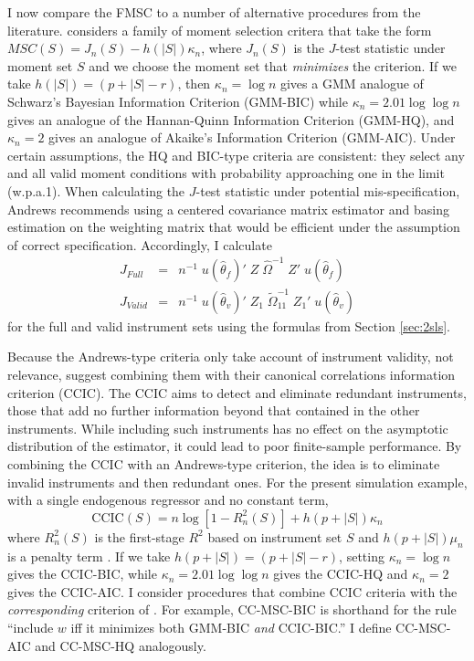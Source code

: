 \documentclass[12pt]{article}
\theoremstyle{definition}
\begin{document}
I now compare the FMSC to a number of alternative procedures from the literature. \cite{Andrews1999} considers a family of moment selection critera that take the form $MSC(S) = J_n(S) - h(|S|)\kappa_n$, where $J_n(S)$ is the $J$-test statistic under moment set $S$ and we choose the moment set that \emph{minimizes} the criterion. If we take $h(|S|) = (p + |S| - r)$, then $\kappa_n = \log{n}$ gives a GMM analogue of Schwarz's Bayesian Information Criterion (GMM-BIC) while $\kappa_n = 2.01 \log{\log{n}}$ gives an analogue of the Hannan-Quinn Information Criterion (GMM-HQ), and $\kappa_n = 2$ gives an analogue of Akaike's Information Criterion (GMM-AIC). Under certain assumptions, the HQ and BIC-type criteria are consistent: they select any and all valid moment conditions with probability approaching one in the limit (w.p.a.1). When calculating the $J$-test statistic under potential mis-specification, Andrews recommends using a centered covariance matrix estimator and basing estimation on the weighting matrix that would be efficient under the assumption of correct specification. Accordingly, I calculate
	\begin{eqnarray}
		J_{Full} &=&n^{-1}\; u( \widehat{\theta}_{f})'\;Z \; \widehat{\Omega}^{-1} \;Z' \;u( \widehat{\theta}_{f})\\
		J_{Valid} &=&n^{-1}\; u( \widehat{\theta}_{v})'\;Z_1 \;\widetilde{\Omega}_{11}^{-1} \;Z_1'\;u( \widehat{\theta}_{v})
	\end{eqnarray}
for the full and valid instrument sets using the formulas from Section \ref{sec:2sls}. 

Because the Andrews-type criteria only take account of instrument validity, not relevance, \cite{HallPeixe2003} suggest combining them with their canonical correlations information criterion (CCIC). The CCIC aims to detect and eliminate redundant instruments, those that add no further information beyond that contained in the other instruments. While including such instruments has no effect on the asymptotic distribution of the estimator, it could lead to poor finite-sample performance. By combining the CCIC with an Andrews-type criterion, the idea is to eliminate invalid instruments and then redundant ones. For the present simulation example, with a single endogenous regressor and no constant term, 
	\begin{equation}
	\mbox{CCIC}(S) = n \log\left[1 - R_n^2(S) \right] + h(p + |S|)\kappa_n
	\end{equation}
where $R_n^2(S)$ is the first-stage $R^2$ based on instrument set $S$ and $h(p + |S|)\mu_n$ is a penalty term \citep{Jana2005}. If we take $h(p + |S|) = (p + |S| - r)$, setting $\kappa_n = \log{n}$ gives the CCIC-BIC, while $\kappa_n = 2.01 \log{\log{n}}$ gives the CCIC-HQ  and $\kappa_n = 2$ gives the CCIC-AIC. I consider procedures that combine CCIC criteria with the \emph{corresponding} criterion of \cite{Andrews1999}. For example, CC-MSC-BIC is shorthand for the rule ``include $w$ iff it minimizes both  GMM-BIC \emph{and} CCIC-BIC.'' I define CC-MSC-AIC and CC-MSC-HQ analogously.
\end{document}
